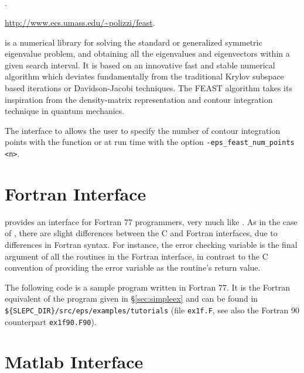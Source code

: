 \subsection*{\underline{\feast}}
	\begin{description}
	\setlength{\itemsep}{0pt}
	\item[References.]\citep{Polizzi:2009:DAS}.
	\item[Website.] \url{http://www.ecs.umass.edu/~polizzi/feast}.
	\item[Summary.] \feast is a numerical library for solving the standard or generalized symmetric eigenvalue problem, and obtaining all the eigenvalues and eigenvectors within a given search interval. It is based on an innovative fast and stable numerical algorithm which deviates fundamentally from the traditional Krylov subspace based iterations or Davidson-Jacobi techniques. The FEAST algorithm takes its inspiration from the density-matrix representation and contour integration technique in quantum mechanics.
	\item[Specific options.] The \slepc interface to \feast allows the user to specify the number of contour integration points with the function  or at run time with the option \Verb!-eps_feast_num_points <n>!.
	\end{description}

\section{Fortran Interface}
\label{sec:fortran}

	\slepc provides an interface for Fortran 77 programmers, very much like \petsc. As in the case of \petsc, there are slight differences between the C and Fortran \slepc interfaces, due to differences in Fortran syntax. For instance, the error checking variable is the final argument of all the routines in the Fortran interface, in contrast to the C convention of providing the error variable as the routine's return value.

	The following code is a sample program written in Fortran 77. It is the Fortran equivalent of the program given in \S\ref{sec:simpleex} and can be found in \Verb!${SLEPC_DIR}/src/eps/examples/tutorials! (file \texttt{ex1f.F}, see also the Fortran 90 counterpart \texttt{ex1f90.F90}).

\section{Matlab Interface}
\label{sec:matlab}

